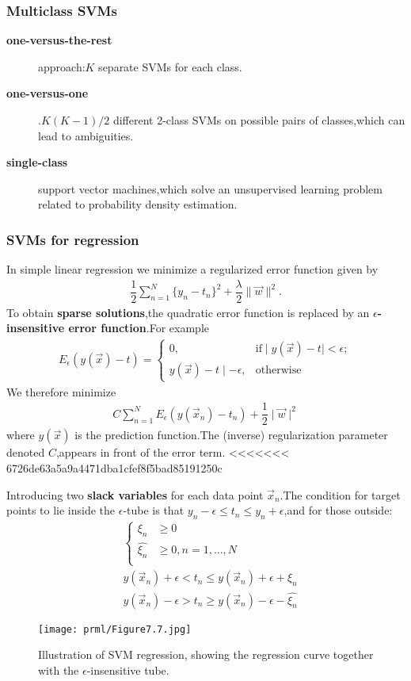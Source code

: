 \subsubsection{Multiclass SVMs}
\begin{description}
	\item[\textbf{one-versus-the-rest}] approach:$K$ separate SVMs for each class.
	\item[\textbf{one-versus-one}].$K(K-1)/2$ different 2-class SVMs on possible pairs of classes,which can lead to ambiguities.
	\item[\textbf{single-class}] support vector machines,which solve an unsupervised learning problem related to probability density estimation.
\end{description}

\subsubsection{SVMs for regression}
In simple linear regression we minimize a regularized error function given by
\begin{align}
\dfrac{1}{2}\sum\limits_{n=1}^{N}\{y_n-t_n\}^2+\dfrac{\lambda}{2}\parallel\vec{w}\parallel^2.
\end{align}
To obtain \textbf{sparse solutions},the quadratic error function is replaced by an \textbf{$\epsilon$-insensitive error function}.For example
\begin{align}
E_{\epsilon}(y(\vec{x})-t) = \begin{cases}
0,&\text{if}\mid y(\vec{x})-t\mid < \epsilon;\\
y(\vec{x})-t\mid - \epsilon,&\text{otherwise}
\end{cases}
\end{align}
We therefore minimize
\begin{align}
C\sum\limits_{n=1}^{N}E_{\epsilon}(y(\vec{x}_n)-t_n)+\dfrac{1}{2}\mid\vec{w}\mid^2
\end{align}
where $y(\vec{x})$ is the prediction function.The (inverse) regularization parameter denoted $C$,appears in front of the error term.
<<<<<<< 6726de63a5a9a4471dba1cfef8f5bad85191250c

Introducing two \textbf{slack variables} for each data point $\vec{x}_n$.The condition for target points to lie inside the $\epsilon$-tube is that $y_n -\epsilon \leq t_n \leq y_n+\epsilon$,and for those outside:
\begin{align}
&\begin{cases}
\xi_n &\geq 0\\
\hat{\xi_n} &\geq 0,n=1,...,N\\
\end{cases}\\
& y(\vec{x}_n)+\epsilon < t_n \leq y(\vec{x}_n)+\epsilon +\xi_n \\
& y(\vec{x}_n)-\epsilon > t_n \geq y(\vec{x}_n)-\epsilon -\hat{\xi_n}
\end{align}
\begin{SCfigure*}
	\caption{Illustration of SVM regression, showing the regression curve together with the $\epsilon$-insensitive tube. }
	\texttt{[image: prml/Figure7.7.jpg]}
\end{SCfigure*}

